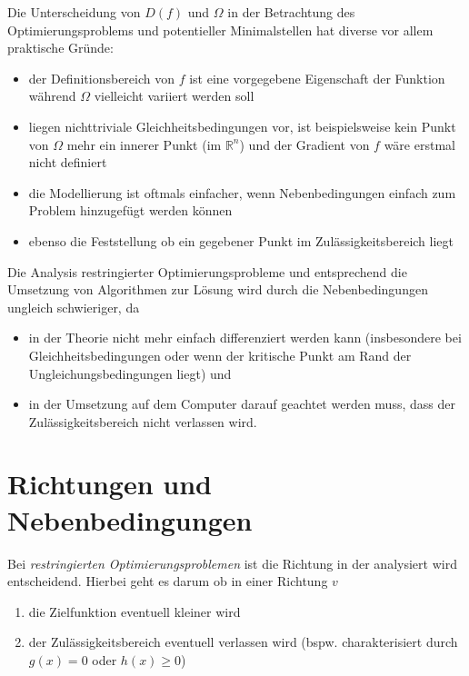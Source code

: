 \documentclass[]{book}
\providecommand{\tightlist}{%
  \setlength{\itemsep}{0pt}\setlength{\parskip}{0pt}}
\theoremstyle{definition}
\theoremstyle{definition}
\theoremstyle{definition}
\theoremstyle{definition}
\theoremstyle{remark}
\begin{document}
Die Unterscheidung von \(D(f)\) und \(\Omega\) in der Betrachtung des Optimierungsproblems und potentieller Minimalstellen hat diverse vor allem praktische Gründe:

\begin{itemize}
\tightlist
\item
  der Definitionsbereich von \(f\) ist eine vorgegebene Eigenschaft der Funktion während \(\Omega\) vielleicht variiert werden soll
\item
  liegen nichttriviale Gleichheitsbedingungen vor, ist beispielsweise kein Punkt von \(\Omega\) mehr ein innerer Punkt (im \(\mathbb R^{n}\)) und der Gradient von \(f\) wäre erstmal nicht definiert
\item
  die Modellierung ist oftmals einfacher, wenn Nebenbedingungen einfach zum Problem hinzugefügt werden können
\item
  ebenso die Feststellung ob ein gegebener Punkt im Zulässigkeitsbereich liegt
\end{itemize}

Die Analysis restringierter Optimierungsprobleme und entsprechend die Umsetzung von Algorithmen zur Lösung wird durch die Nebenbedingungen ungleich schwieriger, da

\begin{itemize}
\tightlist
\item
  in der Theorie nicht mehr einfach differenziert werden kann (insbesondere bei Gleichheitsbedingungen oder wenn der kritische Punkt am Rand der Ungleichungsbedingungen liegt) und
\item
  in der Umsetzung auf dem Computer darauf geachtet werden muss, dass der Zulässigkeitsbereich nicht verlassen wird.
\end{itemize}

\hypertarget{richtungen-und-nebenbedingungen}{%
\section{Richtungen und Nebenbedingungen}\label{richtungen-und-nebenbedingungen}}

Bei \emph{restringierten Optimierungsproblemen} ist die Richtung in der analysiert wird entscheidend. Hierbei geht es darum ob in einer Richtung \(v\)

\begin{enumerate}
\def\labelenumi{\arabic{enumi}.}
\tightlist
\item
  die Zielfunktion eventuell kleiner wird
\item
  der Zulässigkeitsbereich eventuell verlassen wird (bspw. charakterisiert durch \(g(x) = 0\) oder \(h(x)\geq0\))
\end{enumerate}
\end{document}
